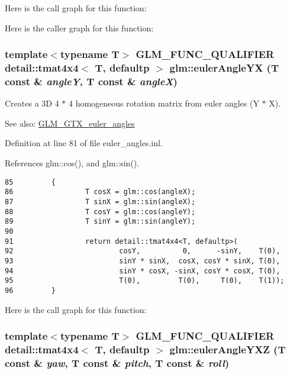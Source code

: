 Here is the call graph for this function:

Here is the caller graph for this function:\hypertarget{group__gtx__euler__angles_gd26afd5add0e121296d3b44dea32f32e}{
\subsubsection[eulerAngleYX]{\setlength{\rightskip}{0pt plus 5cm}template$<$typename T$>$ GLM\_\-FUNC\_\-QUALIFIER detail::tmat4x4$<$ T, defaultp $>$ glm::eulerAngleYX (T const \& {\em angleY}, \/  T const \& {\em angleX})}}
\label{group__gtx__euler__angles_gd26afd5add0e121296d3b44dea32f32e}


Creates a 3D 4 $\ast$ 4 homogeneous rotation matrix from euler angles (Y $\ast$ X). \begin{Desc}
\item[See also:]\hyperlink{group__gtx__euler__angles}{GLM\_\-GTX\_\-euler\_\-angles} \end{Desc}


Definition at line 81 of file euler\_\-angles.inl.

References glm::cos(), and glm::sin().

\begin{Code}\begin{verbatim}85         {
86                 T cosX = glm::cos(angleX);
87                 T sinX = glm::sin(angleX);
88                 T cosY = glm::cos(angleY);
89                 T sinY = glm::sin(angleY);
90 
91                 return detail::tmat4x4<T, defaultp>(
92                         cosY,          0,      -sinY,    T(0),
93                         sinY * sinX,  cosX, cosY * sinX, T(0),
94                         sinY * cosX, -sinX, cosY * cosX, T(0),
95                         T(0),         T(0),     T(0),    T(1));
96         }
\end{verbatim}
\end{Code}




Here is the call graph for this function:\hypertarget{group__gtx__euler__angles_g7ba74fb9419dd90256b682855e904159}{
\subsubsection[eulerAngleYXZ]{\setlength{\rightskip}{0pt plus 5cm}template$<$typename T$>$ GLM\_\-FUNC\_\-QUALIFIER detail::tmat4x4$<$ T, defaultp $>$ glm::eulerAngleYXZ (T const \& {\em yaw}, \/  T const \& {\em pitch}, \/  T const \& {\em roll})}}
\label{group__gtx__euler__angles_g7ba74fb9419dd90256b682855e904159}


